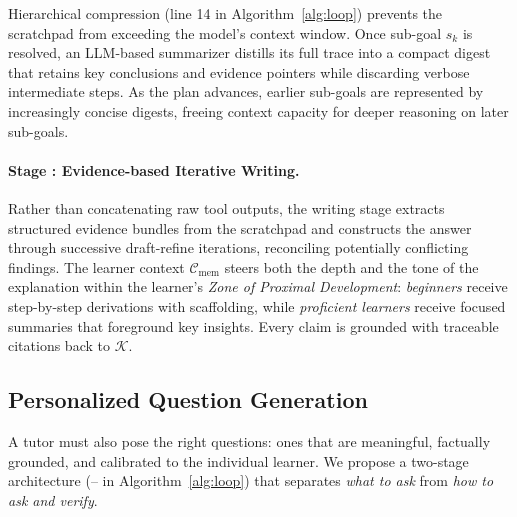 Hierarchical compression (line 14 in Algorithm~\ref{alg:loop}) prevents the scratchpad from exceeding the model's context window.
Once sub-goal $s_k$ is resolved, an LLM-based summarizer distills its full trace into a compact digest that retains key conclusions and evidence pointers while discarding verbose intermediate steps.
As the plan advances, earlier sub-goals are represented by increasingly concise digests, freeing context capacity for deeper reasoning on later sub-goals.

\paragraph{Stage : Evidence-based Iterative Writing.}
Rather than concatenating raw tool outputs, the writing stage extracts structured evidence bundles from the scratchpad and constructs the answer through successive draft-refine iterations, reconciling potentially conflicting findings.
The learner context $\mathcal{C}_{\text{mem}}$
steers both the depth and the tone of the explanation within the learner's \textit{Zone of Proximal Development}: \textit{beginners} receive step-by-step derivations with scaffolding, while \textit{proficient learners} receive focused summaries that foreground key insights.
Every claim is grounded with traceable citations back to $\mathcal{K}$.

\subsection{Personalized Question Generation}
\label{sec:generate}

A tutor must also pose the right questions: ones that are meaningful, factually grounded, and calibrated to the individual learner.
We propose a two-stage architecture (-- in Algorithm~\ref{alg:loop}) that separates \emph{what to ask} from \emph{how to ask and verify}.

